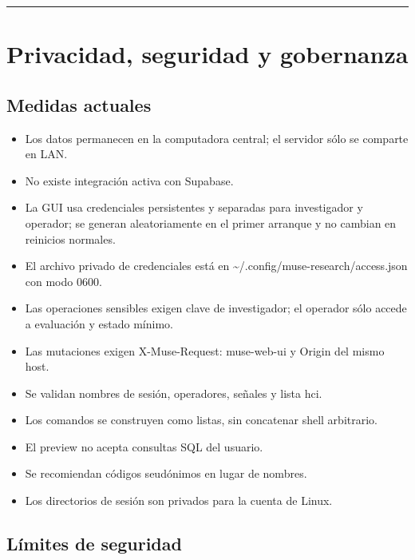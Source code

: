 \documentclass[11pt,a4paper]{article}
\begin{document}
\medskip\hrule\medskip

\section{Privacidad, seguridad y gobernanza}

\subsection{Medidas actuales}

\begin{itemize}
\item Los datos permanecen en la computadora central; el servidor sólo se comparte en LAN.
\item No existe integración activa con Supabase.
\item La GUI usa credenciales persistentes y separadas para investigador y operador; se
generan aleatoriamente en el primer arranque y no cambian en reinicios normales.
\item El archivo privado de credenciales está en
{\ttfamily\small \textasciitilde{}/.config/muse-research/access.json} con modo
{\ttfamily\small 0600}.
\item Las operaciones sensibles exigen clave de investigador; el operador sólo accede a evaluación y estado mínimo.
\item Las mutaciones exigen {\ttfamily\small X-Muse-Request: muse-web-ui} y Origin del mismo host.
\item Se validan nombres de sesión, operadores, señales y lista {\ttfamily\small hci}.
\item Los comandos se construyen como listas, sin concatenar shell arbitrario.
\item El preview no acepta consultas SQL del usuario.
\item Se recomiendan códigos seudónimos en lugar de nombres.
\item Los directorios de sesión son privados para la cuenta de Linux.
\end{itemize}

\subsection{Límites de seguridad}
\end{document}
